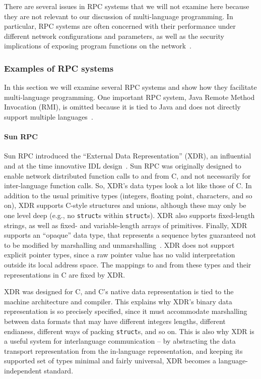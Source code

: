 There are several issues in RPC systems that we will not examine here because they are not relevant to our discussion of multi-language programming. In particular, RPC systems are often concerned with their performance under different network configurations and parameters, as well as the security implications of exposing program functions on the network~\cite{tay90rpc}.

\subsubsection{Examples of RPC systems}

In this section we will examine several RPC systems and show how
they facilitate multi-language programming. One important RPC
system, Java Remote Method Invocation (RMI), is omitted because it
is tied to Java and does not directly support multiple
languages~\cite{waldo98jrmi}.

\paragraph{Sun RPC}

Sun RPC introduced the ``External Data Representation'' (XDR), an influential and at the time innovative IDL design~\cite{coulouris94sunrpc}. Sun RPC was originally designed to enable network distributed function calls to and from C, and not necessarily for inter-language function calls. So, XDR's data types look a lot like those of C. In addition to the usual primitive types (integers, floating point, characters, and so on), XDR supports C-style structures and unions, although these may only be one level deep (e.g., no \texttt{struct}s within \texttt{struct}s). XDR also supports fixed-length strings, as well as fixed- and variable-length arrays of primitives. Finally, XDR supports an ``opaque'' data type, that represents a sequence bytes guaranteed not to be modified by marshalling and unmarshalling~\cite{rfc1832}. XDR does not support explicit pointer types, since a raw pointer value has no valid interpretation outside its local address space. The mappings to and from these types and their representations in C are fixed by XDR.


XDR was designed for C, and C's native data representation is tied to the machine architecture and compiler. This explains why XDR's binary data representation is so precisely specified, since it must accommodate marshalling between data formats that may have different integers lengths, different endianess, different ways of packing \texttt{struct}s, and so on. This is also why XDR is a useful system for interlanguage communication -- by abstracting the data transport representation from the in-language representation, and keeping its supported set of types minimal and fairly universal, XDR becomes a language-independent standard.


